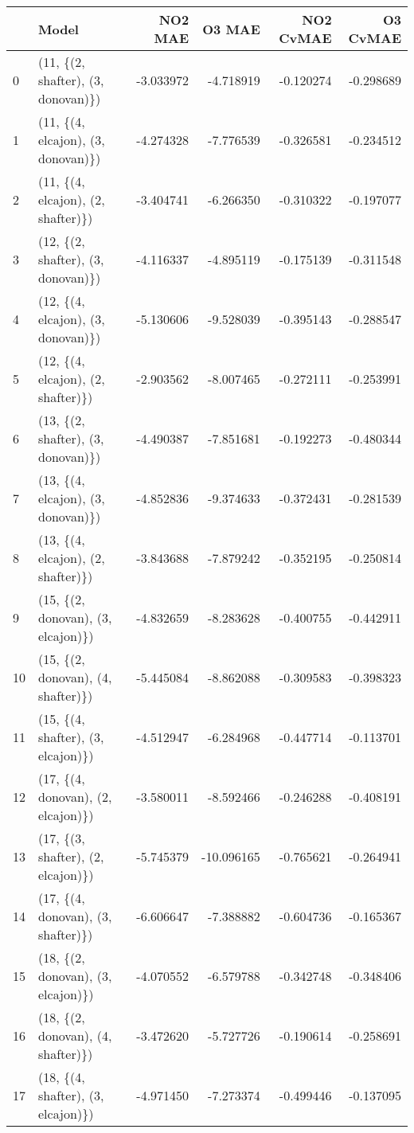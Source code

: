 \begin{tabular}{llrrrr}
\toprule
{} &                               Model &   NO2 MAE &     O3 MAE &  NO2 CvMAE &  O3 CvMAE \\
\midrule
0  &  (11, \{(2, shafter), (3, donovan)\}) & -3.033972 &  -4.718919 &  -0.120274 & -0.298689 \\
1  &  (11, \{(4, elcajon), (3, donovan)\}) & -4.274328 &  -7.776539 &  -0.326581 & -0.234512 \\
2  &  (11, \{(4, elcajon), (2, shafter)\}) & -3.404741 &  -6.266350 &  -0.310322 & -0.197077 \\
3  &  (12, \{(2, shafter), (3, donovan)\}) & -4.116337 &  -4.895119 &  -0.175139 & -0.311548 \\
4  &  (12, \{(4, elcajon), (3, donovan)\}) & -5.130606 &  -9.528039 &  -0.395143 & -0.288547 \\
5  &  (12, \{(4, elcajon), (2, shafter)\}) & -2.903562 &  -8.007465 &  -0.272111 & -0.253991 \\
6  &  (13, \{(2, shafter), (3, donovan)\}) & -4.490387 &  -7.851681 &  -0.192273 & -0.480344 \\
7  &  (13, \{(4, elcajon), (3, donovan)\}) & -4.852836 &  -9.374633 &  -0.372431 & -0.281539 \\
8  &  (13, \{(4, elcajon), (2, shafter)\}) & -3.843688 &  -7.879242 &  -0.352195 & -0.250814 \\
9  &  (15, \{(2, donovan), (3, elcajon)\}) & -4.832659 &  -8.283628 &  -0.400755 & -0.442911 \\
10 &  (15, \{(2, donovan), (4, shafter)\}) & -5.445084 &  -8.862088 &  -0.309583 & -0.398323 \\
11 &  (15, \{(4, shafter), (3, elcajon)\}) & -4.512947 &  -6.284968 &  -0.447714 & -0.113701 \\
12 &  (17, \{(4, donovan), (2, elcajon)\}) & -3.580011 &  -8.592466 &  -0.246288 & -0.408191 \\
13 &  (17, \{(3, shafter), (2, elcajon)\}) & -5.745379 & -10.096165 &  -0.765621 & -0.264941 \\
14 &  (17, \{(4, donovan), (3, shafter)\}) & -6.606647 &  -7.388882 &  -0.604736 & -0.165367 \\
15 &  (18, \{(2, donovan), (3, elcajon)\}) & -4.070552 &  -6.579788 &  -0.342748 & -0.348406 \\
16 &  (18, \{(2, donovan), (4, shafter)\}) & -3.472620 &  -5.727726 &  -0.190614 & -0.258691 \\
17 &  (18, \{(4, shafter), (3, elcajon)\}) & -4.971450 &  -7.273374 &  -0.499446 & -0.137095 \\

\end{tabular}
